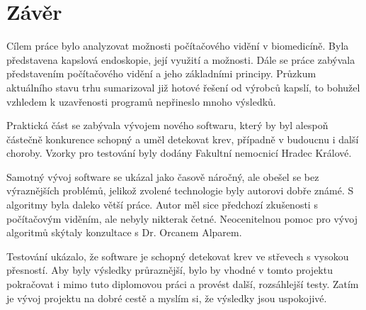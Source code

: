 \chapter{Závěr}
Cílem práce bylo analyzovat možnosti počítačového vidění v biomedicíně. Byla představena kapslová endoskopie, její využití a možnosti. Dále se práce zabývala představením počítačového vidění a jeho základními principy. Průzkum aktuálního stavu trhu sumarizoval již hotové řešení od výrobců kapslí, to bohužel vzhledem k uzavřenosti programů nepřineslo mnoho výsledků.

Praktická část se zabývala vývojem nového softwaru, který by byl alespoň částečně konkurence schopný a uměl detekovat krev, případně v budoucnu i další choroby. Vzorky pro testování byly dodány Fakultní nemocnicí Hradec Králové. 

Samotný vývoj software se ukázal jako časově náročný, ale obešel se bez výraznějších problémů, jelikož zvolené technologie byly autorovi dobře známé. S algoritmy byla daleko větší práce. Autor měl sice předchozí zkušenosti s počítačovým viděním, ale nebyly nikterak četné. Neocenitelnou pomoc pro vývoj algoritmů skýtaly konzultace s Dr. Orcanem Alparem.

Testování ukázalo, že software je schopný detekovat krev ve střevech s vysokou přesností. Aby byly výsledky průraznější, bylo by vhodné v tomto projektu pokračovat i mimo tuto diplomovou práci a provést další, rozsáhlejší testy. Zatím je vývoj projektu na dobré cestě a myslím si, že výsledky jsou uspokojivé.